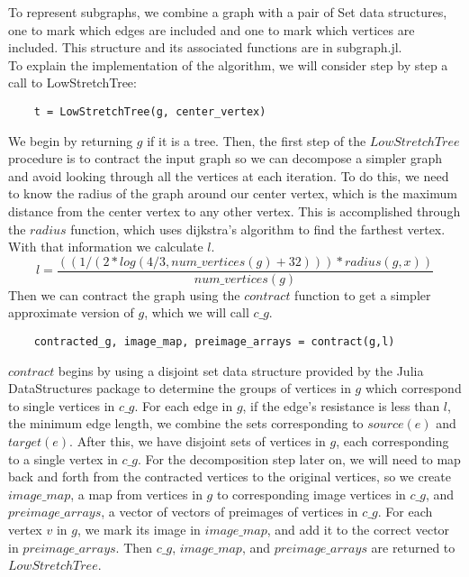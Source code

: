 \documentclass{article}
\begin{document}
To represent subgraphs, we combine a graph with a pair of Set data structures, one to mark which edges are included and one to mark which vertices are included.  This structure and its associated functions are in subgraph.jl.\\	
To explain the implementation of the algorithm, we will consider step by step a call to LowStretchTree:
\begin{verbatim}
	t = LowStretchTree(g, center_vertex)
\end{verbatim}
We begin by returning $g$ if it is a tree.  Then, the first step of the $LowStretchTree$ procedure is to contract the input graph so we can decompose a simpler graph and avoid looking through all the vertices at each iteration.  To do this, we need to know the radius of the graph around our center vertex, which is the maximum distance from the center vertex to any other vertex.  This is accomplished through the $radius$ function, which uses dijkstra's algorithm to find the farthest vertex.  With that information we calculate $l$.
$$l=\frac{((1/(2*log(4/3,num\_vertices(g) + 32)))*radius(g, x))}{num\_vertices(g)}$$
 Then we can contract the graph using the $contract$ function to get a simpler approximate version of $g$, which we will call $c\_g$.
\begin{verbatim}
	contracted_g, image_map, preimage_arrays = contract(g,l)
\end{verbatim}
$contract$ begins by using a disjoint set data structure provided by the Julia DataStructures package to determine the groups of vertices in $g$ which correspond to single vertices in $c\_g$.  For each edge in $g$, if the edge's resistance is less than $l$, the minimum edge length, we combine the sets corresponding to $source(e)$ and $target(e)$.  After this, we have disjoint sets of vertices in $g$, each corresponding to a single vertex in $c\_g$.  For the decomposition step later on, we will need to map back and forth from the contracted vertices to the original vertices, so we create $image\_map$, a map from vertices in $g$ to corresponding image vertices in $c\_g$, and $preimage\_arrays$, a vector of vectors of preimages of vertices in $c\_g$.  For each vertex $v$ in $g$, we mark its image in $image\_map$, and add it to the correct vector in $preimage\_arrays$.  Then $c\_g$, $image\_map$, and $preimage\_arrays$ are returned to $LowStretchTree$.\\
\end{document}
